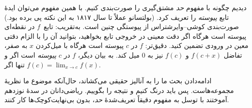 \documentclass[../../../include/open-logic-section]{subfiles}
\begin{document}
دیدیم چگونه با مفهوم \emph{حد} مشتق‌گیری را صورت‌بندی کنیم. با همین مفهوم
می‌توان ایدهٔ تابع \emph{پیوسته} را تعریف کرد. (بولتسانو عملاً تا سال
۱۸۱۷ به این نکته پی برده بود.) صورت‌بندی کوشی--وایرشتراس از پیوستگی چنین
است. به‌تقریب: تابع~$f$ در نقطه‌ای پیوسته است هرگاه اگر دقت معینی در خروجی
تابع بخواهید، بتوانید آن را با الزام دقتی معین در ورودی تضمین کنید.
دقیق‌تر: $f$ در $c$ پیوسته است هرگاه با میل‌کردن $x$ به صفر، تفاضل
$f(c+x)$ و $f(c)$ نیز به $0$ میل کند. به بیان دیگر، $f$ در $c$
\emph{پیوسته} است اگر و تنها اگر
$f(c) = \lim_{x \rightarrow c} f(x)$.

ادامه‌دادن بحث ما را به آنالیز حقیقی می‌کشاند، حال‌آنکه موضوع ما نظریهٔ
مجموعه‌هاست. پس باید درنگ کنیم و نتیجه را بگوییم. ریاضی‌دانان در سدهٔ
نوزدهم آموختند با توسل به مفهوم دقیقاً تعریف‌شدهٔ \emph{حد}، بدون
بی‌نهایت‌کوچک‌ها کار کنند.
\end{document}
